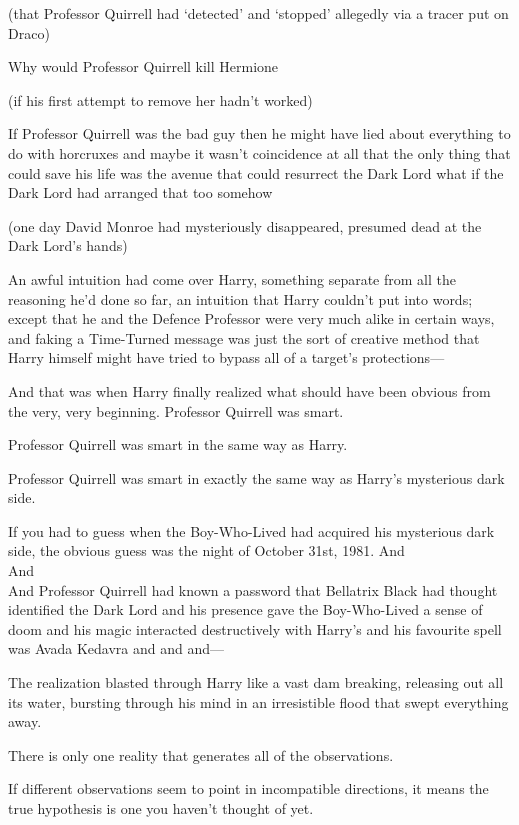 (that Professor Quirrell had `detected' and `stopped' allegedly via a tracer
put on Draco)

Why would Professor Quirrell kill Hermione

(if his first attempt to remove her hadn't worked)

If Professor Quirrell was the bad guy then he might have lied about everything
to do with horcruxes and maybe it wasn't coincidence at all that the only thing
that could save his life was the avenue that could resurrect the Dark Lord what
if the Dark Lord had arranged that too somehow

(one day David Monroe had mysteriously disappeared, presumed dead at the Dark
Lord's hands)

An awful intuition had come over Harry, something separate from all the
reasoning he'd done so far, an intuition that Harry couldn't put into words;
except that he and the Defence Professor were very much alike in certain ways,
and faking a Time-Turned message was just the sort of creative method that
Harry himself might have tried to bypass all of a target's protections—

And that was when Harry finally realized what should have been obvious from the
very, very beginning.
\later
Professor Quirrell was smart.

Professor Quirrell was smart in the same way as Harry.

Professor Quirrell was smart in exactly the same way as Harry's mysterious dark
side.

If you had to guess when the Boy-Who-Lived had acquired his mysterious dark
side, the obvious guess was the night of October 31st, 1981.
\later
And\\
And\\
And Professor Quirrell had known a password that Bellatrix Black had thought
identified the Dark Lord and his presence gave the Boy-Who-Lived a sense of
doom and his magic interacted destructively with Harry's and his favourite spell
was Avada Kedavra and and and—

The realization blasted through Harry like a vast dam breaking, releasing out
all its water, bursting through his mind in an irresistible flood that swept
everything away.

There is only one reality that generates all of the observations.

If different observations seem to point in incompatible directions, it means
the true hypothesis is one you haven't thought of yet.

